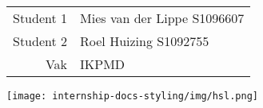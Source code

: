 \begin{titlepage}
	
	\stylizedtitle
	\stylizedauthor
	\titlepageversion
	
	\vfill
	
	\begin{tabular}{rl}
		Student 1 & Mies van der Lippe \hspace{1cm}S1096607\\
		Student 2 & Roel Huizing \hfill S1092755\\
		Vak		  & IKPMD \\
	\end{tabular}
	
	\vspace{10mm}
	
	\hfill
	\texttt{[image: internship-docs-styling/img/hsl.png]}	
	
\end{titlepage}